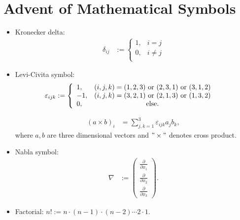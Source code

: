 \documentclass[../../note.tex]{subfiles}
\begin{document}
\chapter{Advent of Mathematical Symbols}
\begin{itemize}
    \item Kronecker delta:
    \begin{align}
        \delta_{ij} 
        &:= 
        \left\{ 
            \begin{array}{lc}
                1, & i=j      \\
                0, & i \neq j \\
            \end{array}
        \right.
    \end{align}
    \item Levi-Civita symbol: 
    \begin{align}
        \varepsilon_{ijk}
        &:= 
        \left\{
            \begin{array}{lc}
                1,  & (i,j,k)=(1,2,3)~{\rm or}~(2,3,1)~{\rm or}~(3,1,2)   \\
                -1, & (i,j,k)=(3,2,1)~{\rm or}~(2,1,3)~{\rm or}~(1,3,2) \\
                0,  & {\rm else}.
            \end{array}
        \right.
    \end{align}
    \begin{example}
        \begin{align}
            (a \times b)_i
            &= \sum_{j,k=1}^3 \varepsilon_{ijk} a_j b_k,
        \end{align}
        where $a,b$ are three dimensional vectors and $"\times"$ denotes cross product.
    \end{example}
    \item Nabla symbol:
    \begin{align}
        \nabla
        &:= 
        \left(
            \begin{array}{lc}
                \frac{\partial}{\partial x_1} \\
                \frac{\partial}{\partial x_2} \\
                \frac{\partial}{\partial x_3}
            \end{array}  
        \right).
    \end{align}
    \item Factorial: $n!:= n \cdot (n-1) \cdot (n-2) \cdots 2 \cdot 1$.
    

\end{itemize}
\end{document}
